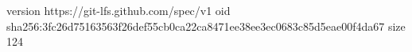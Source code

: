 version https://git-lfs.github.com/spec/v1
oid sha256:3fc26d75163563f26def55cb0ca22ca8471ee38ee3ec0683c85d5eae00f4da67
size 124
